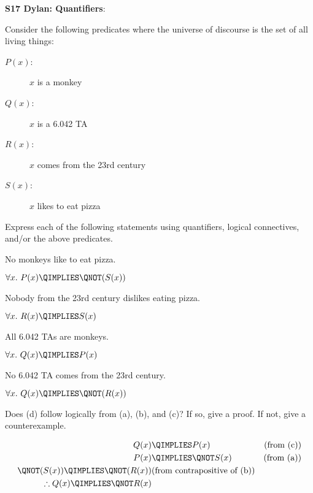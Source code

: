 \begin{problem} 
\begin{staffnotes}
\textbf{S17 Dylan: Quantifiers}:
\end{staffnotes}

Consider the following predicates where the universe of discourse is
the set of all living things:
\begin{description}
\item[$P(x)$:] $x$ is a monkey
\item[$Q(x)$:] $x$ is a 6.042 TA
\item[$R(x)$:] $x$ comes from the 23rd century
\item[$S(x)$:] $x$ likes to eat pizza
\end{description}
Express each of the following statements using quantifiers, logical
connectives, and/or the above predicates.

\begin{problemparts}
\ppart No monkeys like to eat pizza.

\begin{solution}
$\forall x.\ P(x) \QIMPLIES \QNOT(S(x))$
\end{solution}

\ppart Nobody from the 23rd century dislikes eating pizza.

\begin{solution}
$\forall x.\ R(x) \QIMPLIES S(x)$
\end{solution}

\ppart All 6.042 TAs are monkeys.

\begin{solution}
$\forall x.\ Q(x) \QIMPLIES P(x)$
\end{solution}

\ppart  No 6.042 TA comes from the 23rd century.

\begin{solution}
$\forall x.\ Q(x) \QIMPLIES \QNOT(R(x))$
\end{solution}

\ppart Does (d) follow logically from (a), (b), and (c)?  If so, give
a proof.  If not, give a counterexample.

\begin{solution}
\begin{center}
\begin{align*}
Q(x) & \QIMPLIES P(x) & \text{(from (c))} \\
P(x) & \QIMPLIES \QNOT S(x) & \text{(from (a))} \\
\QNOT(S(x)) \QIMPLIES \QNOT(R(x)) & \text{(from contrapositive of (b))}\\ 
\therefore Q(x) \QIMPLIES \QNOT R(x)
\end{align*}
\end{center}
\end{solution}


\end{problemparts}
\end{problem}
